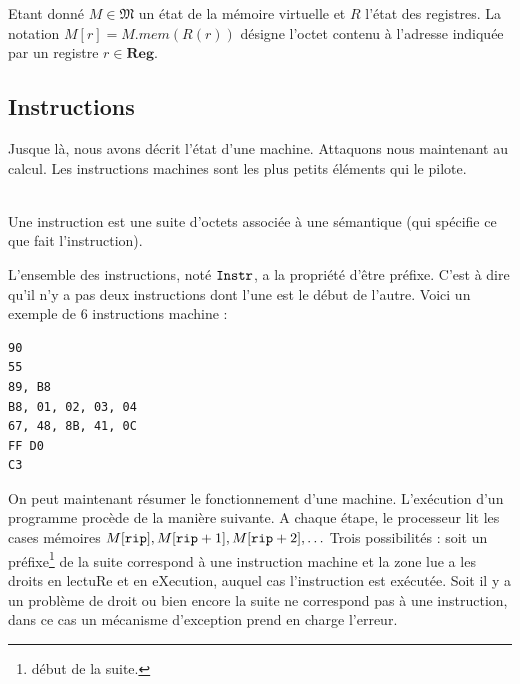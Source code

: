 \documentclass{book}
\newenvironment{formalisme}[1]{%
	\def\FrameCommand{\fboxrule=\FrameRule\fboxsep=\FrameSep \fcolorbox{red!10}{red!5}}%
	\MakeFramed {\advance\hsize-\width \FrameRestore}
	\noindent {\bf #1}\\
}%
{\endMakeFramed}
\newcommand{\rip}{{\tt rip}\xspace}
\newcommand{\Memory}{{\mathfrak{M}}}
\newcommand{\Reg}{{\mathbf{Reg}}}
\begin{document}

Etant donné $M \in \Memory$ un état de la mémoire virtuelle et $R$ l'état des registres. La notation $M[r] = M.mem(R(r))$ désigne l'octet contenu à l'adresse indiquée par un registre $r \in \Reg$.%


\subsection{Instructions}

\newcommand{\Instr}{{\tt Instr}}

Jusque là, nous avons décrit l'état d'une machine. Attaquons nous maintenant au calcul. Les instructions machines sont les plus petits éléments qui le pilote.

\begin{formalisme}{Instruction}
Une instruction est une suite d'octets associée à une sémantique (qui spécifie ce que fait l'instruction). 
	
L'ensemble des instructions, noté $\Instr$, a la propriété d'être préfixe. C'est à dire qu'il n'y a pas deux instructions dont l'une est le début de l'autre.  	
\end{formalisme}
Voici un exemple de 6 instructions machine : 
\begin{verbatim}
90
55
89, B8
B8, 01, 02, 03, 04
67, 48, 8B, 41, 0C
FF D0
C3
\end{verbatim}

On peut maintenant résumer le fonctionnement d'une machine.  L'exécution d'un programme procède de la manière suivante. A chaque étape, le processeur lit les cases mémoires $M[\rip], M[\rip+1], M[\rip+2], \ldots$ Trois possibilités :  soit un préfixe\footnote{début de la suite.} de la suite correspond à une instruction machine  et la zone lue a les droits en lectuRe et en eXecution, auquel cas l'instruction est exécutée. Soit il y a un problème de droit ou bien encore la suite ne correspond pas à une instruction, dans ce cas un mécanisme d'exception prend en charge l'erreur. 
\end{document}
